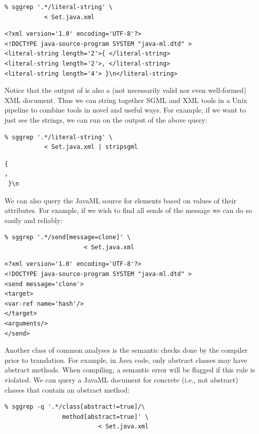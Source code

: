 \documentclass{article}
\begin{document}
\begin{verbatim}
% sggrep '.*/literal-string' \
           < Set.java.xml
\end{verbatim}

{\small
\begin{verbatim}
<?xml version='1.0' encoding='UTF-8'?>
<!DOCTYPE java-source-program SYSTEM "java-ml.dtd" >
<literal-string length='2'>{ </literal-string>
<literal-string length='2'>, </literal-string>
<literal-string length='4'> }\n</literal-string>
\end{verbatim}
}

\noindent Notice that the output of  is also a (not necessarily
valid nor even well-formed) XML document.  Thus we can string together
SGML and XML tools in a Unix pipeline to combine tools in novel and
useful ways.  For example, if we want to just see the strings, we can
run  on the output of the above query:

\begin{verbatim}
% sggrep '.*/literal-string' \
           < Set.java.xml | stripsgml
\end{verbatim}
\begin{verbatim}
{ 
, 
 }\n
\end{verbatim}

We can also query the JavaML source for elements based on values of
their attributes.  For example, if we wish to find all sends of the
message  we can do so easily and reliably:

{\bfseries
\begin{verbatim}
% sggrep '.*/send[message=clone]' \
                      < Set.java.xml 
\end{verbatim}
}

{\small
\begin{verbatim}
<?xml version='1.0' encoding='UTF-8'?>
<!DOCTYPE java-source-program SYSTEM "java-ml.dtd" >
<send message='clone'>
<target>
<var-ref name='hash'/>
</target>
<arguments/>
</send>
\end{verbatim}
}

Another class of common analyses is the semantic checks done by the
compiler prior to translation.  For example, in Java code, only abstract
classes may have abstract methods.  When compiling, a semantic error
will be flagged if this rule is violated.  We can query a JavaML document
for concrete (i.e., not abstract) classes that contain an abstract method:

{\small
\begin{verbatim}
% sggrep -q '.*/class[abstract!=true]/\
                method[abstract=true]' \
                          < Set.java.xml
\end{verbatim}
}
\end{document}
